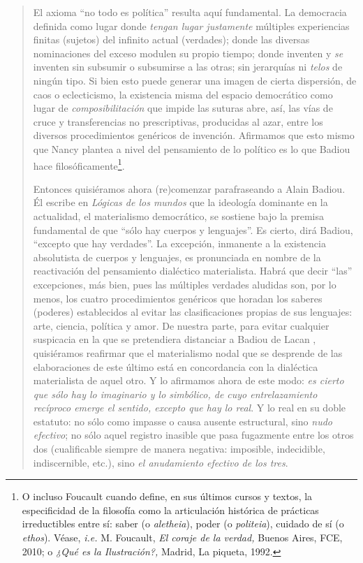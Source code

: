 \begin{quote}
El axioma \enquote{no todo es política} resulta aquí fundamental. La democracia definida como lugar donde \emph{tengan lugar justamente} múltiples experiencias finitas (sujetos) del infinito actual (verdades); donde las diversas nominaciones del exceso modulen su propio tiempo; donde inventen y \emph{se} inventen sin subsumir o subsumirse a las otras; sin jerarquías ni \emph{telos} de ningún tipo. Si bien esto puede generar una imagen de cierta dispersión, de caos o eclecticismo, la existencia misma del espacio democrático como lugar de \emph{composibilitación} que impide las suturas abre, así, las vías de cruce y transferencias no prescriptivas, producidas al azar, entre los diversos procedimientos genéricos de invención. Afirmamos que esto mismo que Nancy plantea a nivel del pensamiento de lo político  es lo que Badiou hace filosóficamente\footnote{O incluso Foucault cuando define, en sus últimos cursos y textos, la especificidad de la filosofía como la articulación histórica de prácticas irreductibles entre sí: saber (o \emph{aletheia}), poder (o \emph{politeia}), cuidado de sí (o \emph{ethos}). Véase, \emph{i.e.} M. Foucault, \emph{El coraje de la verdad,} Buenos Aires, FCE, 2010; o \emph{¿Qué es la Ilustración?,} Madrid, La piqueta, 1992.}.

Entonces quisiéramos ahora (re)comenzar  parafraseando a Alain Badiou. Él escribe en \emph{Lógicas de los mundos} que la ideología dominante en la actualidad, el materialismo democrático, se sostiene bajo la premisa fundamental de que \enquote{sólo hay cuerpos y lenguajes}. Es cierto, dirá Badiou, \enquote{excepto que hay verdades}. La excepción, inmanente a la existencia absolutista de cuerpos y lenguajes, es pronunciada en nombre de la reactivación del pensamiento dialéctico materialista. Habrá que decir \enquote{las} excepciones, más bien, pues las múltiples verdades aludidas son, por lo menos, los cuatro procedimientos genéricos que horadan los saberes (poderes) establecidos al evitar las clasificaciones propias de sus lenguajes: arte, ciencia, política y amor. De nuestra parte, para evitar cualquier suspicacia en la que se pretendiera distanciar a Badiou de Lacan , quisiéramos reafirmar que el materialismo nodal que se desprende de las elaboraciones de este último está en concordancia con la dialéctica materialista de aquel otro. Y lo afirmamos ahora de este modo: \emph{es cierto que sólo hay lo imaginario y lo simbólico, de cuyo entrelazamiento recíproco emerge el sentido, excepto que hay lo real}. Y lo real en su doble estatuto: no sólo como impasse o causa ausente estructural, sino \emph{nudo efectivo}; no sólo aquel registro inasible que pasa fugazmente entre los otros dos (cualificable siempre de manera negativa: imposible, indecidible, indiscernible, etc.), sino \emph{el anudamiento efectivo de los tres}.


\end{quote}

